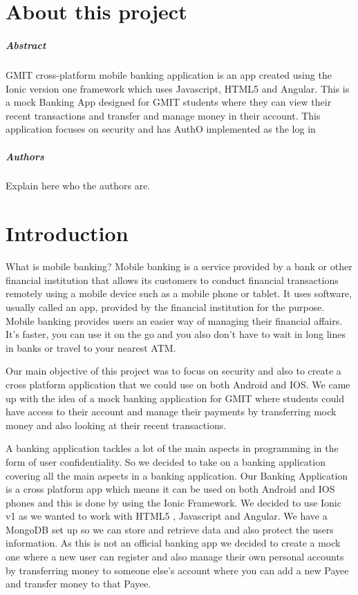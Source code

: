 
\chapter*{About this project}
\paragraph{Abstract}
GMIT cross-platform mobile banking application is an app created using the Ionic version one framework which uses Javascript, HTML5 and Angular. This is a mock Banking App designed for GMIT students where they can view their recent transactions and transfer and manage money in their account. This application focuses on security and has AuthO implemented as the log in  

\paragraph{Authors}
Explain here who the authors are.



\chapter{Introduction}
What is mobile banking? Mobile banking is a service provided by a bank or other financial institution that allows its customers to conduct financial transactions remotely using a mobile device such as a mobile phone or tablet\cite{mobilebankingwiki}. It uses software, usually called an app, provided by the financial institution for the purpose\cite{mobilebankingwiki}. Mobile banking provides users an easier way of managing their financial affairs. It's faster, you can use it on the go and you also don't have to wait in long lines in banks or travel to your nearest ATM.

Our main objective of this project was to focus on security and also to create a cross platform application that we could use on both Android and IOS. We came up with the idea of a mock banking application for GMIT where students could have access to their account and manage their payments by transferring mock money and also looking at their recent transactions.

A banking application tackles a lot of the main aspects in programming in the form of user 
confidentiality. So we decided to take on a banking application covering all the main aspects in a banking application.
	Our Banking Application is a cross platform app which means it can be used on both 
Android and IOS phones and this is done by using the Ionic Framework. We decided to use Ionic v1
as we wanted to work with HTML5 , Javascript and Angular. We have a MongoDB set up so we can 
store and retrieve data and also protect the users information. As this is not an official 
banking app we decided to create a mock one where a new user can register and also manage their 
own personal accounts by transferring money to someone else's account where you can add a new 
Payee and transfer money to that Payee. 

